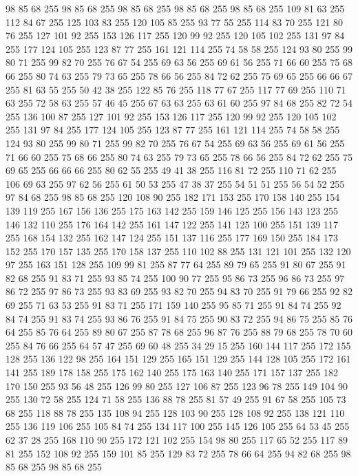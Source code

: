 98 85 68 255 98 85 68 255 98 85 68 255 98 85 68 255 98 85 68 255 109 81 63 255 112 84 67 255 125 103 83 255 120 105 85 255 93 77 55 255 114 83 70 255 121 80 76 255 127 101 92 255 153 126 117 255 120 99 92 255 120 105 102 255 131 97 84 255 177 124 105 255 123 87 77 255 161 121 114 255 74 58 58 255 124 93 80 255 99 80 71 255 99 82 70 255 76 67 54 255 69 63 56 255 69 61 56 255 71 66 60 255 75 68 66 255 80 74 63 255 79 73 65 255 78 66 56 255 84 72 62 255 75 69 65 255 66 66 67 255 81 63 55 255 50 42 38 255 122 85 76 255 118 77 67 255 117 77 69 255 110 71 63 255 72 58 63 255 57 46 45 255 67 63 63 255 63 61 60 255 97 84 68 255 82 72 54 255 136 100 87 255 127 101 92 255 153 126 117 255 120 99 92 255 120 105 102 255 131 97 84 255 177 124 105 255 123 87 77 255 161 121 114 255 74 58 58 255 124 93 80 255 99 80 71 255 99 82 70 255 76 67 54 255 69 63 56 255 69 61 56 255 71 66 60 255
75 68 66 255 80 74 63 255 79 73 65 255 78 66 56 255 84 72 62 255 75 69 65 255 66 66 66 255 80 62 55 255 49 41 38 255 116 81 72 255 110 71 62 255 106 69 63 255 97 62 56 255 61 50 53 255 47 38 37 255 54 51 51 255 56 54 52 255 97 84 68 255 98 85 68 255 120 108 90 255 182 171 153 255 170 158 140 255 154 139 119 255 167 156 136 255 175 163 142 255 159 146 125 255 156 143 123 255 146 132 110 255 176 164 142 255 161 147 122 255 141 125 100 255 151 139 117 255 168 154 132 255 162 147 124 255 151 137 116 255 177 169 150 255 184 173 152 255 170 157 135 255 170 158 137 255 110 102 88 255 131 121 101 255 132 120 97 255 163 151 128 255 109 99 81 255 87 77 64 255 89 79 65 255 91 80 67 255 91 82 68 255 91 83 71 255 93 85 74 255 100 90 77 255 95 86 73 255 96 86 73 255 97 86 72 255 97 86 73 255 93 83 69 255 93 82 70 255 94 83 70 255 91 79 66 255 92 82 69 255 71 63 53 255 91 83 71 255 171 159 140 255 95 85 71 255
91 84 74 255 92 84 74 255 91 83 74 255 93 86 76 255 91 84 75 255 90 83 72 255 94 86 75 255 85 76 64 255 85 76 64 255 89 80 67 255 87 78 68 255 96 87 76 255 88 79 68 255 78 70 60 255 84 76 66 255 64 57 47 255 69 60 48 255 34 29 15 255 160 144 117 255 172 155 128 255 136 122 98 255 164 151 129 255 165 151 129 255 144 128 105 255 172 161 141 255 189 178 158 255 175 162 140 255 175 163 140 255 171 157 137 255 182 170 150 255 93 56 48 255 126 99 80 255 127 106 87 255 123 96 78 255 149 104 90 255 130 72 58 255 124 71 58 255 136 88 78 255 81 57 49 255 91 67 58 255 105 73 68 255 118 88 78 255 135 108 94 255 128 103 90 255 128 108 92 255 138 121 110 255 136 119 106 255 105 84 74 255 134 117 100 255 145 126 105 255 64 53 45 255 62 37 28 255 168 110 90 255 172 121 102 255 154 98 80 255 117 65 52 255 117 89 81 255 152 108 92 255 159 101 85 255 129 83 72 255 78 66 64 255 94 82 68 255 98 85 68 255 98 85 68 255

